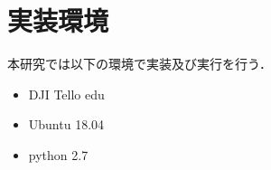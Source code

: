 \section{実装環境}
\label{env}

本研究では以下の環境で実装及び実行を行う．
\begin{itemize}
  \item DJI Tello edu
  \item Ubuntu 18.04
  \item python 2.7
\end{itemize}
